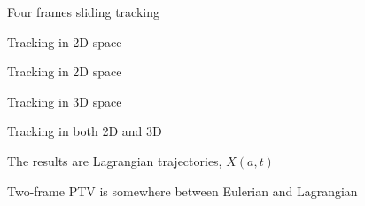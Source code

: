 \begin{frame}[label=ptv-10]{Four frames sliding tracking}
    \centering{}
\end{frame}

\begin{frame}[label=ptv-11]{Tracking in 2D space}
    \centering{}
\end{frame}


\begin{frame}[label=ptv-12]{Tracking in 2D space}
	\centering{}
\end{frame}


\begin{frame}[label=ptv-13]{Tracking in 3D space }
	\centering{}
\end{frame}


\begin{frame}[label=ptv-14]{Tracking in both 2D and 3D}
	\centering{}
\end{frame}

			

\begin{frame}[label=ptv-15]{The results are Lagrangian trajectories, $X(a,t)$}
    \centering
\end{frame}


\begin{frame}[label=ptv-16]{Two-frame PTV is somewhere between Eulerian and Lagrangian}
    \centering{}
\end{frame}


